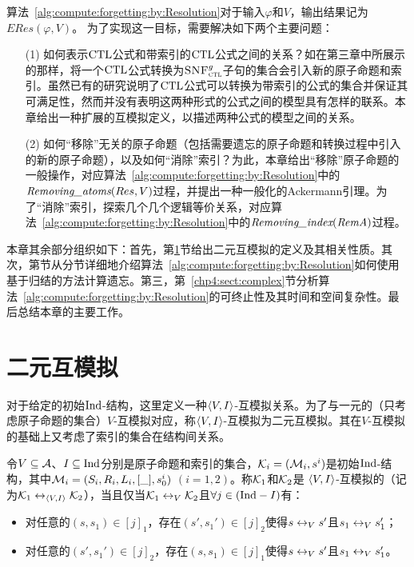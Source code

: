 算法~\ref{alg:compute:forgetting:by:Resolution}对于输入$\varphi$和$V$，输出结果记为$ERes(\varphi, V)$。
为了实现这一目标，需要解决如下两个主要问题：
\begin{itemize}
	\item[(1)] 如何表示$\textrm{CTL}$公式和带索引的$\textrm{CTL}$公式之间的关系？如在第三章中所展示的那样，将一个$\textrm{CTL}$公式转换为${\textsc{SNF}_{\textsc{ctl}}^g}$子句的集合会引入新的原子命题和索引。虽然已有的研究说明了$\textrm{CTL}$公式可以转换为带索引的公式的集合并保证其可满足性，然而并没有表明这两种形式的公式之间的模型具有怎样的联系。本章给出一种扩展的互模拟定义，以描述两种公式的模型之间的关系。
	\item[(2)] 如何“移除”无关的原子命题（包括需要遗忘的原子命题和转换过程中引入的新的原子命题），以及如何“消除”索引？为此，本章给出“移除”原子命题的一般操作，对应算法~\ref{alg:compute:forgetting:by:Resolution}中的$\emph{Removing\_atoms}(Res, V)$过程，并提出一种一般化的Ackermann引理。为了“消除”索引，探索几个几个逻辑等价关系，对应算法~\ref{alg:compute:forgetting:by:Resolution}中的$\emph{Removing\_index}(\emph{RemA})$过程。
\end{itemize}

本章其余部分组织如下：首先，第\ref{chapter4:sub:biVB}节给出二元互模拟的定义及其相关性质。其次，第\label{chp4:sect:res}节从分节详细地介绍算法~\ref{alg:compute:forgetting:by:Resolution}如何使用基于归结的方法计算遗忘。第三，第~\ref{chp4:sect:complex}节分析算法~\ref{alg:compute:forgetting:by:Resolution}的可终止性及其时间和空间复杂性。最后总结本章的主要工作。



\section{二元互模拟}
\label{chapter4:sub:biVB}
对于给定的初始$\textrm{Ind}$-结构，这里定义一种${\langle{V, I}\rangle}$-互模拟关系。为了与一元的（只考虑原子命题的集合）$V$-互模拟对应，称${\langle{V, I}\rangle}$-互模拟为二元互模拟。其在$V$-互模拟的基础上又考虑了索引的集合在结构间关系。
\begin{definition}[二元互模拟] \label{def:VInd:bisimulation}
	令$V\subseteq {\cal A}$、$I\subseteq \textrm{Ind}$分别是原子命题和索引的集合，${\cal K}_i=({\cal M}_i,s^i)$是初始$\textrm{Ind}$-结构，其中${\cal M}_i=(S_i, R_i, L_i, [\_],s_0^i)$ $(i=1,2)$。称${\cal K}_1$和${\cal K}_2$是 ${\langle{V, I}\rangle}$-互模拟的（记为${\cal K}_1 \leftrightarrow_{{\langle{V, I}\rangle}} {\cal K}_2$），当且仅当${\cal K}_1 \leftrightarrow_V {\cal K}_2$且$\forall j\in (\textrm{Ind} - I)$有：
	\begin{itemize}
		\item 对任意的$(s,s_1) \in [j]_1$，存在$(s',s_1')\in [j]_2$使得$s\leftrightarrow_V s'$且$s_1 \leftrightarrow_V s_1'$；
		\item 对任意的$(s',s_1') \in [j]_2$，存在$(s,s_1)\in [j]_1$使得$s\leftrightarrow_V s'$且$s_1 \leftrightarrow_V s_1'$。
	\end{itemize}
	
\end{definition}

